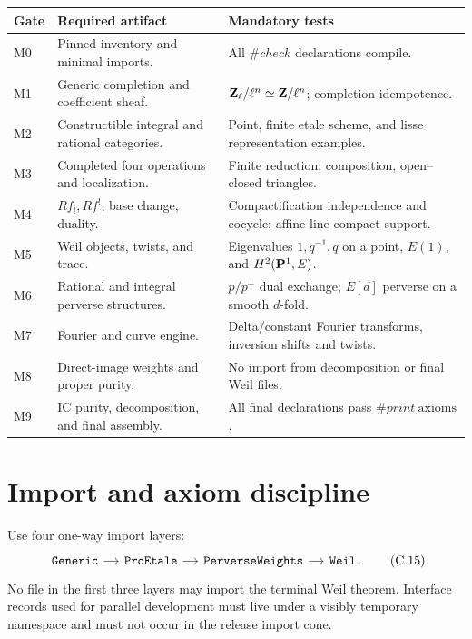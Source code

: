 \begin{longtable}{
 >{\raggedright\arraybackslash}p{}
 >{\raggedright\arraybackslash}p{}
 >{\raggedright\arraybackslash}p{}}
\toprule
Gate & Required artifact & Mandatory tests\\
\midrule
\endhead
M0 &
Pinned inventory and minimal imports. &
All \(\#check\) declarations compile.\\

M1 &
Generic completion and coefficient sheaf. &
\(\mathbf Z_\ell/\ell^n\simeq\mathbf Z/\ell^n\);
completion idempotence.\\

M2 &
Constructible integral and rational categories. &
Point, finite etale scheme, and lisse representation examples.\\

M3 &
Completed four operations and localization. &
Finite reduction, composition, open--closed triangles.\\

M4 &
\(Rf_!,Rf^!\), base change, duality. &
Compactification independence and cocycle; affine-line compact support.\\

M5 &
Weil objects, twists, and trace. &
Eigenvalues \(1,q^{-1},q\) on a point, \(E(1)\), and
\(H^2(\mathbf P^1,E)\).\\

M6 &
Rational and integral perverse structures. &
\(p/p^+\) dual exchange; \(E[d]\) perverse on a smooth \(d\)-fold.\\

M7 &
Fourier and curve engine. &
Delta/constant Fourier transforms, inversion shifts and twists.\\

M8 &
Direct-image weights and proper purity. &
No import from decomposition or final Weil files.\\

M9 &
IC purity, decomposition, and final assembly. &
All final declarations pass \(\#print\ \mathrm{axioms}\).\\
\bottomrule
\end{longtable}

\section{Import and axiom discipline}

Use four one-way import layers:
\[
\begin{tikzcd}[column sep=small]
\texttt{Generic}
 \arrow[r] &
\texttt{ProEtale}
 \arrow[r] &
\texttt{PerverseWeights}
 \arrow[r] &
\texttt{Weil}.
\end{tikzcd}
\tag{C.15}\label{eq:formalization-import-layers}
\]
No file in the first three layers may import the terminal Weil theorem.
Interface records used for parallel development must live under a visibly
temporary namespace and must not occur in the release import cone.

